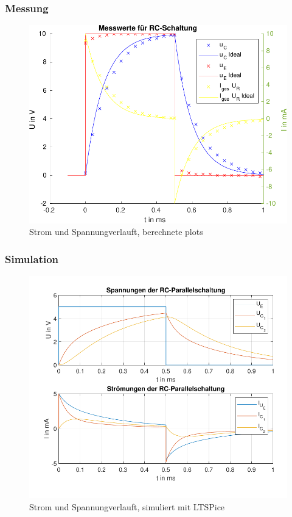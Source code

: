 \subsubsection{Messung}
\begin{figure}[H]
    \centering
    \includegraphics{src/labor2messwerte.pdf}
    \caption{Strom und Spannungverlauft, berechnete plots}
    \label{fig:my_label}
\end{figure}

\subsubsection{Simulation}
\begin{figure}[H]
    \centering
    \includegraphics{src/labor2pdf.pdf}
    \caption{Strom und Spannungverlauft, simuliert mit LTSPice}
    \label{fig:my_label2}
\end{figure}
%
%
%
%
%
%
%